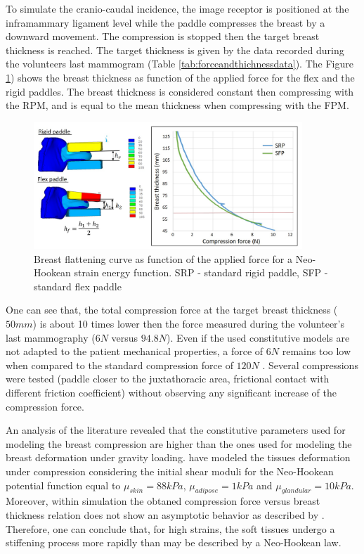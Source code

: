 To simulate the cranio-caudal incidence, the image receptor is positioned at the inframammary ligament level while the paddle compresses the breast by a downward movement. The compression is stopped then the target breast thickness is reached. The target thickness is given by the data recorded during the volunteers last mammogram (Table \ref{tab:forceandthichnessdata}). The Figure \ref{fig:thicknessforcerelationNH}) shows the breast thickness as function of the applied force for the flex and the rigid paddles. The breast thickness is considered constant then compressing with the RPM, and is equal to the mean thickness when compressing with the FPM. 
 
\begin{figure}[!h]
\centering
\includegraphics[width=0.9\textwidth,keepaspectratio]{figures/compressionforceNH.jpg} 
\caption{Breast flattening curve as function of the applied force for a Neo-Hookean strain energy function. SRP - standard rigid paddle, SFP -standard flex paddle}\label{fig:thicknessforcerelationNH}
\end{figure}

One can see that, the total compression force at the target breast thickness ($50mm$) is about 10 times lower then the force measured during the volunteer's last mammography ($6N$ versus $94.8N$). Even if the used constitutive models are not adapted to the patient mechanical properties, a force of $6N$ remains too low when compared to the standard compression force of $120N$ \citep{chida_reduced_2009}.   Several compressions were tested (paddle closer to the juxtathoracic area, frictional contact with different friction coefficient) without observing any significant increase of the compression force. 

An analysis of the literature revealed that the constitutive parameters used for modeling the breast compression are higher than the ones used for modeling the breast deformation under gravity loading.  \cite{sturgeon_finite_element_2016} have modeled the tissues deformation under compression considering the initial shear moduli for the Neo-Hookean potential function equal to $\mu_{skin} = 88kPa$, $\mu_{adipose} = 1kPa$ and $\mu_{glandular}= 10kPa$. Moreover, within simulation the obtaned compression force versus breast thickness relation does not show an asymptotic behavior as described by \cite{de_pain_2015}.  Therefore, one can conclude that, for high strains, the soft tissues undergo a stiffening process more rapidly than may be described by a Neo-Hookean law.

